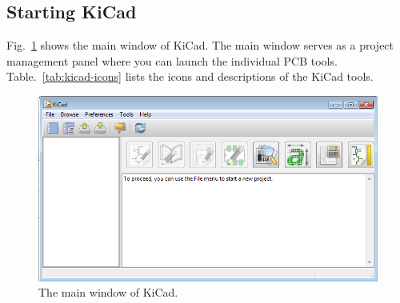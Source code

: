 \documentclass[12pt,letterpaper]{scrartcl}
\begin{document}
\subsection{Starting KiCad}

Fig.~\ref{fig:kicad-main} shows the main window of KiCad. The main window serves as a project management panel where you can launch the individual PCB tools. Table.~\ref{tab:kicad-icons} lists the icons and descriptions of the KiCad tools. 

\begin{figure}[ht]
\centering
\includegraphics[width=4.5in]{kicad-main.png}
\caption{The main window of KiCad.}
\label{fig:kicad-main}
\end{figure}
\end{document}
